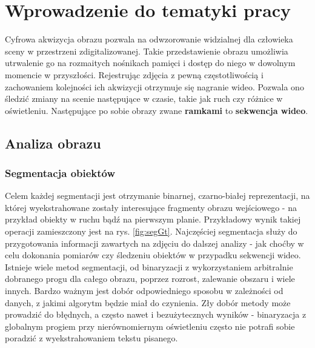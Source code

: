 \chapter{Wprowadzenie do tematyki pracy}
\label{cha:tematykaPracy}
Cyfrowa akwizycja obrazu pozwala na odwzorowanie widzialnej dla człowieka sceny w przestrzeni zdigitalizowanej. Takie przedstawienie obrazu umożliwia utrwalenie go na rozmaitych nośnikach pamięci i dostęp do niego w dowolnym momencie w przyszłości. Rejestrując zdjęcia z pewną częstotliwością i zachowaniem kolejności ich akwizycji otrzymuje się nagranie wideo. Pozwala ono śledzić zmiany na scenie następujące w czasie, takie jak ruch czy różnice w oświetleniu. Następujące po sobie obrazy zwane \textbf{ramkami} to \textbf{sekwencja wideo}.

\section{Analiza obrazu}  
\subsection{Segmentacja obiektów}
Celem każdej segmentacji jest otrzymanie binarnej, czarno-białej reprezentacji, na której wyekstrahowane zostały interesujące fragmenty obrazu wejściowego - na przykład obiekty w ruchu bądź na pierwszym planie. Przykładowy wynik takiej operacji zamieszczony jest na rys. \ref{fig:segGt}. Najczęściej segmentacja służy do przygotowania informacji zawartych na zdjęciu do dalszej analizy - jak choćby w celu dokonania pomiarów czy śledzeniu obiektów w przypadku sekwencji wideo. Istnieje wiele metod segmentacji, od binaryzacji z wykorzystaniem arbitralnie dobranego progu dla całego obrazu, poprzez rozrost, zalewanie obszaru i wiele innych. Bardzo ważnym jest dobór odpowiedniego sposobu w zależności od danych, z jakimi algorytm będzie miał do czynienia. Zły dobór metody może prowadzić do błędnych, a często nawet i bezużytecznych wyników - binaryzacja z globalnym progiem przy nierównomiernym oświetleniu często nie potrafi sobie poradzić z wyekstrahowaniem tekstu pisanego.

